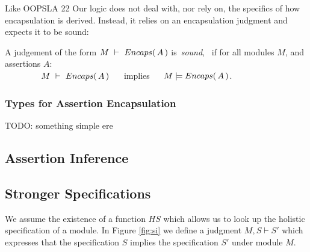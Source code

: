 Like OOPSLA 22 Our logic does not {deal with, nor} rely on, the specifics of  how   encapsulation
{is derived}.
{Instead, it relies} on an encapsulation judgment and expects it to be sound:

\begin{definition}
\label{lem:encap-soundness}
A judgement of the form $M\ \vdash\ {Encaps(\, A\, )}$  is\  \emph{sound}, \ if 
for all modules $M$, and assertions $A$:\\

$\strut \hspace{1.5cm} M\ \vdash\ {Encaps(\, A\, )} \ \ \ \ $ implies $\ \ \ \ \satisfies{M}{\encaps{A}}$.
\end{definition}




\subsubsection{Types for Assertion Encapsulation}
\label{types}
TODO: something simple ere 

\subsection{Assertion Inference}




\subsection{Stronger Specifications}

We assume   the existence of a function $HS$ which allows us to look up the holistic specification of a module. 
In Figure \ref{fig:si} we   define a judgment $M, S \vdash S'$ which expresses that the specification $S$ implies the specification $S'$ under module $M$.  

